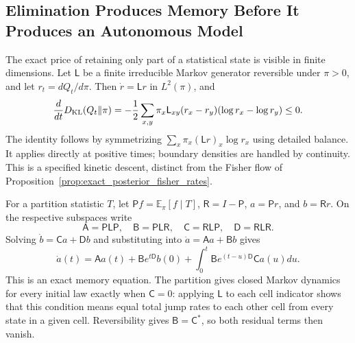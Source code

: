 \subsection{Elimination Produces Memory Before It Produces an Autonomous Model}
\label{sec:one_law_memory_reduction}

The exact price of retaining only part of a statistical state is visible in finite dimensions. Let $\mathsf L$ be a finite irreducible Markov generator reversible under $\pi>0$, and let $r_t=dQ_t/d\pi$. Then $\dot r=\mathsf Lr$ in $L^2(\pi)$, and
\begin{equation}
\frac{d}{dt}D_{\rm KL}(Q_t\Vert\pi)
=-\frac12\sum_{x,y}\pi_x\mathsf L_{xy}(r_x-r_y)(\log r_x-\log r_y)\leq0.
\label{eq:kinetic_kl_dissipation}
\end{equation}
The identity follows by symmetrizing $\sum_x\pi_x(\mathsf Lr)_x\log r_x$ using detailed balance. It applies directly at positive times; boundary densities are handled by continuity. This is a specified kinetic descent, distinct from the Fisher flow of Proposition~\ref{prop:exact_posterior_fisher_rates}.

For a partition statistic $T$, let $\mathsf P f=\mathbb E_\pi[f\mid T]$, $\mathsf R=I-\mathsf P$, $a=\mathsf Pr$, and $b=\mathsf Rr$. On the respective subspaces write
\begin{equation}
\mathsf A=\mathsf P\mathsf L\mathsf P,\quad
\mathsf B=\mathsf P\mathsf L\mathsf R,\quad
\mathsf C=\mathsf R\mathsf L\mathsf P,\quad
\mathsf D=\mathsf R\mathsf L\mathsf R.
\end{equation}
Solving $\dot b=\mathsf Ca+\mathsf Db$ and substituting into $\dot a=\mathsf Aa+\mathsf Bb$ gives
\begin{equation}
\dot a(t)=\mathsf Aa(t)+\mathsf Be^{t\mathsf D}b(0)
+\int_0^t\mathsf Be^{(t-u)\mathsf D}\mathsf Ca(u)du.
\label{eq:one_law_exact_memory}
\end{equation}
This is an exact memory equation. The partition gives closed Markov dynamics for every initial law exactly when $\mathsf C=0$: applying $\mathsf L$ to each cell indicator shows that this condition means equal total jump rates to each other cell from every state in a given cell. Reversibility gives $\mathsf B=\mathsf C^*$, so both residual terms then vanish.

